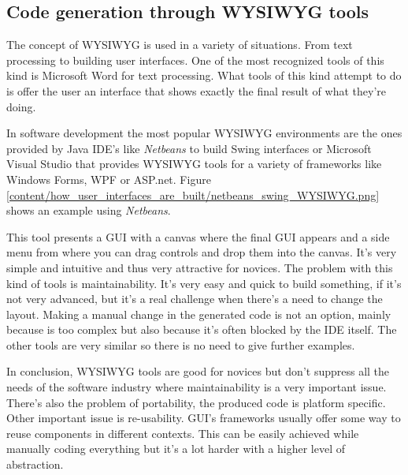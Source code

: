 \subsection{Code generation through WYSIWYG tools}
The concept of WYSIWYG is used in a variety of situations. From text processing to building user interfaces. One of the most recognized tools of this kind is Microsoft Word for text processing. What tools of this kind attempt to do is offer the user an interface that shows exactly the final result of what they're doing.

In software development the most popular WYSIWYG environments are the ones provided by Java IDE's like \textit{Netbeans} to build Swing interfaces or Microsoft Visual Studio that provides WYSIWYG tools for a variety of frameworks like Windows Forms, WPF or ASP.net. Figure \ref{content/how_user_interfaces_are_built/netbeans_swing_WYSIWYG.png} shows an example using \textit{Netbeans}.

This tool presents a GUI with a canvas where the final GUI appears and a side menu from where you can drag controls and drop them into the canvas. It's very simple and intuitive and thus very attractive for novices. The problem with this kind of tools is maintainability. It's very easy and quick to build something, if it's not very advanced, but it's a real challenge when there's a need to change the layout. Making a manual change in the generated code is not an option, mainly because is too complex but also because it's often blocked by the IDE itself. The other tools are very similar so there is no need to give further examples.

In conclusion, WYSIWYG tools are good for novices but don't suppress all the needs of the software industry where maintainability is a very important issue. There's also the problem of portability, the produced code is platform specific. Other important issue is re-usability. GUI's frameworks usually offer some way to reuse components in different contexts. This can be easily achieved while manually coding everything but it's a lot harder with a higher level of abstraction.